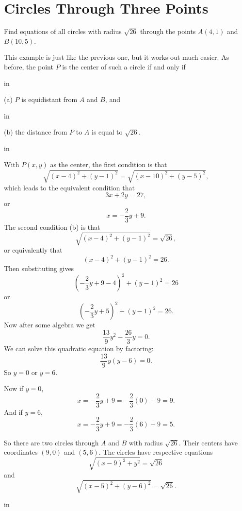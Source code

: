 \documentclass{ximera}
\newcommand{\pskip}{\vskip 0.1 in}
\begin{document}
\section*{Circles Through Three Points}

\begin{example} \label{Ex5a}
Find equations of all circles with radius $\sqrt{26}$ through the points $A(4,1)$ and $B(10,5)$.

\begin{explanation}
This example is just like the previous one, but it works out much easier. As before, the point $P$ is the center of such a circle if and only if

\pskip

(a) $P$ is equidistant from $A$ and $B$, and 

\pskip
 
(b) the distance from $P$ to $A$ is equal to $\sqrt{26}$. 

\pskip

With $P(x,y)$ as the center, the first condition is that
\[
  \sqrt{(x-4)^2 + (y-1)^2} = \sqrt{(x-10)^2+(y-5)^2} ,
\]
 which leads to the equivalent condition that
\[
   3x + 2y = 27 , 
\]
or 
\[
    x = -\frac{2}{3}y + 9 .
\]
The second condition (b) is that
\[
   \sqrt{(x-4)^2 + (y-1)^2} =\sqrt{26} ,
\]
or equivalently that
\[
   (x-4)^2 + (y-1)^2 = 26.
\]
Then substituting gives
\[
    \left( -\frac{2}{3}y+9-4 \right)^2 + (y-1)^2 = 26
\]
or
\[
    \left( -\frac{2}{3}y+5 \right)^2 + (y-1)^2 = 26 .
\]
Now after some algebra we get
\[
   \frac{13}{9}y^2 - \frac{26}{3}y = 0.
\]
We can solve this quadratic equation by factoring:
\[
 \frac{13}{9}y \left(  y-6   \right) = 0 .
\]
So $y=0$ or $y=6$.

Now if $y=0$, 
\[
   x = -\frac{2}{3}y + 9 = -\frac{2}{3}(0) + 9 = 9 .
\]
And if $y=6$, 
\[
x = -\frac{2}{3}y + 9 = -\frac{2}{3}(6) + 9 = 5 .
\]

So there are two circles through $A$ and $B$ with radius $\sqrt{26}$. Their centers have coordinates $(9,0)$ and $(5,6)$. The circles have respective equations
\[
  \sqrt{(x-9)^2 + y^2} =\sqrt{26}
\]
and
\[
\sqrt{(x-5)^2 + (y-6)^2} =\sqrt{26} .
\]

\pskip


\end{explanation}

\end{example}
\end{document}
